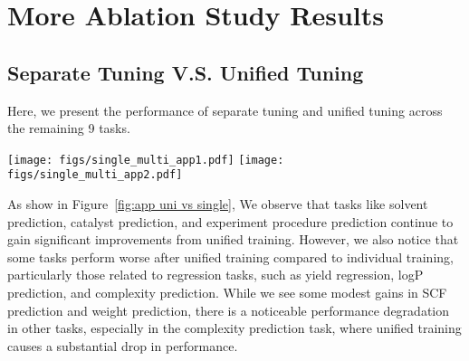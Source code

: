 \begin{table}[t]
\centering
\label{tab:exp proced}
\scriptsize
\renewcommand{\arraystretch}{1.1}
\caption{\small Results of experimental procedure prediction.}
\end{table}



\section{More Ablation Study Results}
\label{sec:more ablation}

\subsection{Separate Tuning V.S. Unified Tuning}
Here, we present the performance of separate tuning and unified tuning across the remaining 9 tasks. 
\begin{figure*}[t]
    \centering
    \texttt{[image: figs/single\_multi\_app1.pdf]}
    \texttt{[image: figs/single\_multi\_app2.pdf]}
    \vspace{-0.3cm}
    \caption{Additional results from the ablation study comparing our unified instruction tuning to separate training.}
    \label{fig:app uni vs single}
    \vspace{-0.3cm}
\end{figure*}


As show in Figure~\ref{fig:app uni vs single}, We observe that tasks like solvent prediction, catalyst prediction, and experiment procedure prediction continue to gain significant improvements from unified training. However, we also notice that some tasks perform worse after unified training compared to individual training, particularly those related to regression tasks, such as yield regression, logP prediction, and complexity prediction. While we see some modest gains in SCF prediction and weight prediction, there is a noticeable performance degradation in other tasks, especially in the complexity prediction task, where unified training causes a substantial drop in performance.


